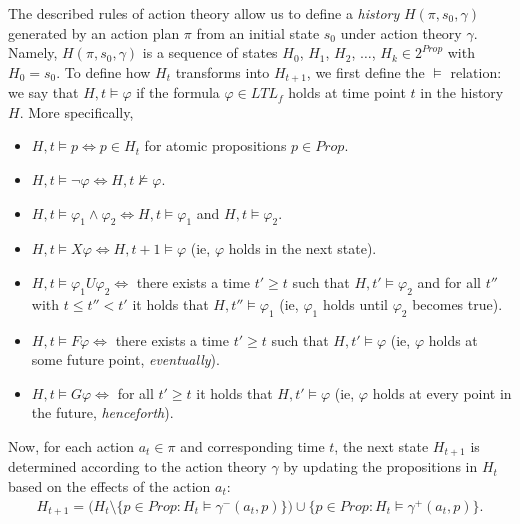 \documentclass[]{jair}
\begin{document}
The described rules of action theory allow us to define a {\it history} $H(\pi, s_0, \gamma)$
generated by an action plan $\pi$ from an initial state $s_0$
under action theory $\gamma$. Namely, $H(\pi, s_0, \gamma)$
is a sequence of states $H_0$, $H_1$, $H_2$, $\dots$, $H_k\in 2^{Prop}$ with $H_0=s_0$. To define how $H_t$ transforms
into $H_{t+1}$, we first define the $\models$ relation: we say that $H, t \models \varphi$ if the formula \( \varphi\in LTL_f \) holds at time point $t$ in the history \( H \). More specifically,
\begin{itemize}
    \item \( H, t \models p \iff p \in H_{t} \)  for atomic propositions $p\in Prop$.
    \item \( H, t \models \neg \varphi \iff H, t \not\models \varphi \).
    \item \( H, t \models \varphi_1 \land \varphi_2 \iff H, t \models \varphi_1 \) and \( H, t \models \varphi_2 \).
    \item \( H, t \models X \varphi \iff H, t+1 \models \varphi \) (ie, \( \varphi \) holds in the next state).
    \item \( H, t \models \varphi_1 U \varphi_2 \iff \) there exists a time \( t' \geq t \) such that \( H, t' \models \varphi_2 \) and for all \( t'' \) with \( t \leq t'' < t' \) it holds that \( H, t'' \models \varphi_1 \) (ie, \( \varphi_1 \) holds until \( \varphi_2 \) becomes true).
    \item \( H, t \models F \varphi \iff \) there exists a time \( t' \geq t \) such that \( H, t' \models \varphi \) (ie, \( \varphi \) holds at some future point, {\it eventually}).
    \item \( H, t \models G \varphi \iff \) for all \( t' \geq t \) it holds that \( H, t' \models \varphi \) (ie, \( \varphi \) holds at every point in the future, {\it henceforth}). %
\end{itemize}

Now, for each action \( a_t \in \pi \) and corresponding time \( t \), the next state \( H_{t+1} \) is determined according to the action theory \( \gamma \) by updating the propositions in \( H_t \) based on the effects of the action \( a_t \):
\begin{equation}\label{h}
\begin{aligned}
H_{t+1} = \bigg( H_{t} \setminus \{ p \in \mathit{Prop} : H_{t} \models \gamma^-(a_t, p) \} \bigg) \cup \{ p \in \mathit{Prop} : H_{t} \models \gamma^+(a_t, p) \}.
\end{aligned}
\end{equation}
\end{document}
